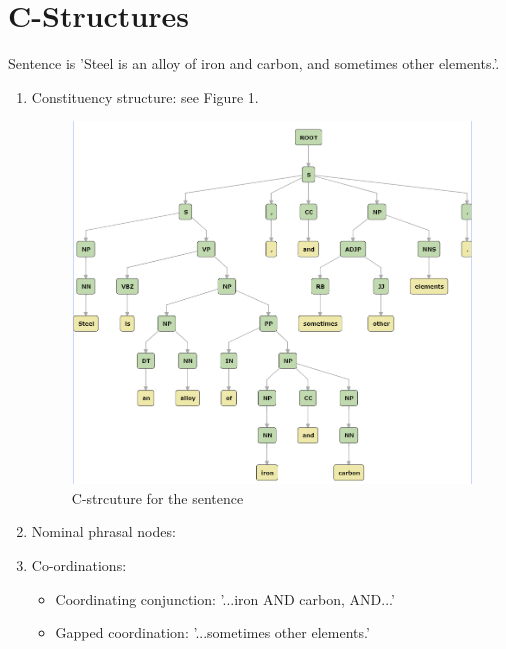 \documentclass[12pt]{report}
\begin{document}
\section{C-Structures}
Sentence is 'Steel is an alloy of iron and carbon, and sometimes other
elements.'.
\begin{enumerate}
  \item Constituency structure: see Figure 1.
  \begin{figure}[ht]
    \includegraphics[width=\linewidth]{task2img.PNG}
    \caption{C-strcuture for the sentence}
    \label{Cstruct}
  \end{figure}
  \item Nominal phrasal nodes:
  \item Co-ordinations:
  \begin{itemize}
    \item Coordinating conjunction: '...iron AND carbon, AND...'
    \item Gapped coordination: '...sometimes other elements.'
  \end{itemize}
\end{enumerate}
\end{document}
